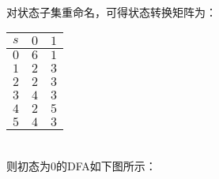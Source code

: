 \documentclass{article}
\begin{document}
\\
对状态子集重命名，可得状态转换矩阵为：
\begin{table}[h]
    \centering
\begin{tabular}{|p{3cm}<{\centering}|p{3cm}<{\centering}|p{3cm}<{\centering}|}   
    \hline
    $s$ & $0$ & $1$ \\
    \hline
    $0$ & $6$ & $1$ \\
    \hline
    $1$ & $2$ & $3$ \\
    \hline
    $2$ & $2$ & $3$ \\
    \hline
    $3$ & $4$ & $3$ \\
    \hline
    $4$ & $2$ & $5$ \\
    \hline
    $5$ & $4$ & $3$ \\
    \hline
\end{tabular}
\end{table}
\\
则初态为0的DFA如下图所示：
\end{document}
